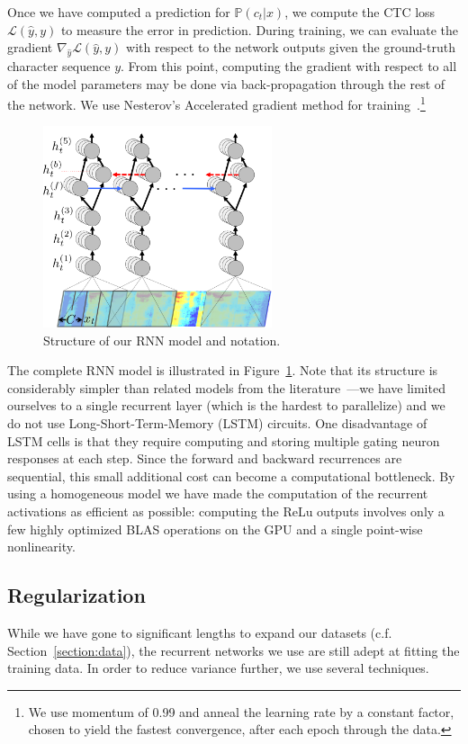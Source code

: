\documentclass{article}
\begin{document}
Once we have computed a prediction for $\mathbb{P}(c_t|x)$, we compute the CTC
loss~\cite{Graves2006} $\mathcal{L}(\hat{y}, y)$ to measure the error in
prediction.  During training, we can evaluate the gradient $\nabla_{\hat{y}}
\mathcal{L}(\hat{y}, y)$ with respect to the network outputs given the
ground-truth character sequence $y$.  From this point, computing the gradient
with respect to all of the model parameters may be done via back-propagation
through the rest of the network. We use Nesterov's Accelerated gradient method
for training~\cite{sutskever2013nag}.\footnote{We use momentum of 0.99 and
anneal the learning rate by a constant factor, chosen to yield the fastest
convergence, after each epoch through the data.}

\begin{figure}[th]
\centering
 \includegraphics[width=0.6\textwidth]{rnn_fig.png}
  \caption{Structure of our RNN model and notation.}
  \label{fig:rnn}
\end{figure}

The complete RNN model is illustrated in Figure~\ref{fig:rnn}.  Note that its
structure is considerably simpler than related models from the
literature~\cite{Graves2014}---we have limited ourselves to a single recurrent
layer (which is the hardest to parallelize) and we do not use
Long-Short-Term-Memory (LSTM) circuits.  One disadvantage of LSTM cells is that
they require computing and storing multiple gating neuron responses at each
step.  Since the forward and backward recurrences are sequential, this small
additional cost can become a computational bottleneck.  By using a homogeneous
model we have made the computation of the recurrent activations as efficient as
possible:  computing the ReLu outputs involves only a few highly optimized BLAS
operations on the GPU and a single point-wise nonlinearity.

\subsection{Regularization}
While we have gone to significant lengths to expand our datasets (c.f.
Section~\ref{section:data}), the recurrent networks we use are still adept at
fitting the training data.  In order to reduce variance further, we use several
techniques.  
\end{document}
